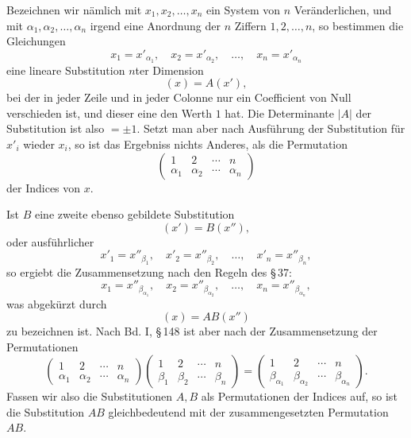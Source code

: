\documentclass[11pt]{article}
\begin{document}
Bezeichnen wir nämlich mit $x_1,x_2,\ldots,x_n$ ein System von $n$ Veränderlichen, und mit $\alpha_1,\alpha_2,\ldots,\alpha_n$ irgend eine Anordnung der $n$ Ziffern $1,2,\ldots,n$, so bestimmen die Gleichungen
\begin{equation}
x_1=x'_{\alpha_1},\quad x_2=x'_{\alpha_2},\quad\ldots,\quad x_n=x'_{\alpha_n}
\tag{1}
\end{equation}
eine lineare Substitution $n$ter Dimension
\begin{equation}
(x)=A(x'),
\tag{2}
\end{equation}
bei der in jeder Zeile und in jeder Colonne nur ein Coefficient von Null verschieden ist, und dieser eine den Werth $1$ hat. Die Determinante $|A|$ der Substitution ist also $=\pm1$. Setzt man aber nach Ausführung der Substitution für $x'_i$ wieder $x_i$, so ist das Ergebniss nichts Anderes, als die Permutation
\[
\begin{pmatrix}1&2&\cdots&n\\\alpha_1&\alpha_2&\cdots&\alpha_n\end{pmatrix}
\]
der Indices von $x$.

Ist $B$ eine zweite ebenso gebildete Substitution
\begin{equation}
(x')=B(x''),
\tag{3}
\end{equation}
oder ausführlicher
\begin{equation}
x'_1=x''_{\beta_1},\quad x'_2=x''_{\beta_2},\quad\ldots,\quad x'_n=x''_{\beta_n},
\tag{4}
\end{equation}
so ergiebt die Zusammensetzung nach den Regeln des \S\,37:
\begin{equation}
x_1=x''_{\beta_{\alpha_1}},\quad x_2=x''_{\beta_{\alpha_2}},\quad\ldots,\quad x_n=x''_{\beta_{\alpha_n}},
\tag{5}
\end{equation}
was abgekürzt durch
\begin{equation}
(x)=AB(x'')
\tag{6}
\end{equation}
zu bezeichnen ist. Nach Bd. I, \S\,148 ist aber nach der Zusammensetzung der Permutationen
\begin{equation}
\begin{pmatrix}1&2&\cdots&n\\\alpha_1&\alpha_2&\cdots&\alpha_n\end{pmatrix}
\begin{pmatrix}1&2&\cdots&n\\\beta_1&\beta_2&\cdots&\beta_n\end{pmatrix}
=
\begin{pmatrix}1&2&\cdots&n\\\beta_{\alpha_1}&\beta_{\alpha_2}&\cdots&\beta_{\alpha_n}\end{pmatrix}.
\tag{7}
\end{equation}
Fassen wir also die Substitutionen $A,B$ als Permutationen der Indices auf, so ist die Substitution $AB$ gleichbedeutend mit der zusammengesetzten Permutation $AB$.
\end{document}
